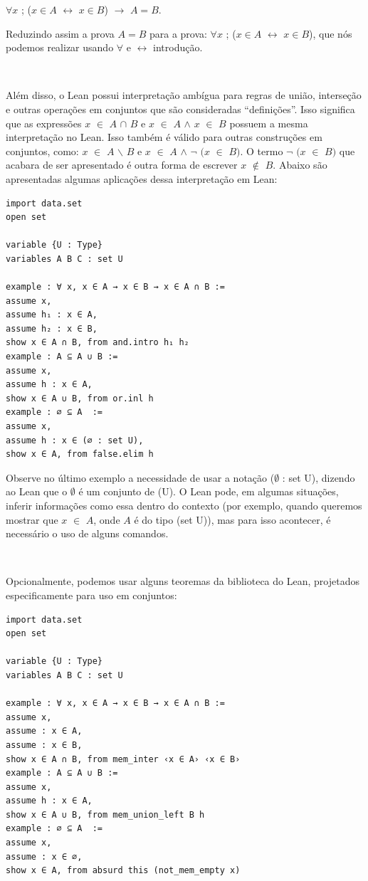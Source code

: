 \begin{center}
    $\forall x$ ; ($x \in A$ $\leftrightarrow$ $x \in B$) $\rightarrow$ $A = B$.  
\end{center}

Reduzindo assim a prova $A = B$ para a prova: $\forall x$ ; ($x \in A$ $\leftrightarrow$ $x \in B$), que nós podemos realizar usando $\forall$ e $\leftrightarrow$ introdução.

$\qquad$

Além disso, o Lean possui interpretação ambígua para regras de união, interseção e outras operações em conjuntos que são consideradas “definições”. Isso significa que as expressões $x$ $\in$ $A$ $\cap$ $B$ e $x$ $\in$ $A$ $\wedge$ $x$ $\in$ $B$ possuem a mesma interpretação no Lean. Isso também é válido para outras construções em conjuntos, como: $x$ $\in$ $A$ $\backslash $ $B$ e $x$ $\in$ $A$ $\wedge$ $\neg$ $(x$ $\in$ $B)$. O termo $\neg$ $(x$ $\in$ $B)$ que acabara de ser apresentado é outra forma de escrever $x$ $\notin$ $B$. Abaixo são apresentadas algumas aplicações dessa interpretação em Lean:

\begin{lstlisting}
import data.set
open set

variable {U : Type}
variables A B C : set U

example : ∀ x, x ∈ A → x ∈ B → x ∈ A ∩ B :=
assume x,
assume h₁ : x ∈ A,
assume h₂ : x ∈ B,
show x ∈ A ∩ B, from and.intro h₁ h₂
example : A ⊆ A ∪ B :=
assume x,
assume h : x ∈ A,
show x ∈ A ∪ B, from or.inl h
example : ∅ ⊆ A  :=
assume x,
assume h : x ∈ (∅ : set U),
show x ∈ A, from false.elim h

\end{lstlisting}

Observe no último exemplo a necessidade de usar a notação {
\selectfont ($\emptyset$ : set U)}, dizendo ao Lean que o $\emptyset$ é um conjunto de {
\selectfont (U)}. O Lean pode, em algumas situações, inferir informações como essa dentro do contexto (por exemplo, quando queremos mostrar que $x$ $\in$ $A$, onde $A$ é do tipo {
\selectfont (set U)}), mas para isso acontecer, é necessário o uso de alguns comandos.

$\qquad$

Opcionalmente, podemos usar alguns teoremas da biblioteca do Lean, projetados especificamente para uso em conjuntos:

\begin{lstlisting}
import data.set
open set

variable {U : Type}
variables A B C : set U

example : ∀ x, x ∈ A → x ∈ B → x ∈ A ∩ B :=
assume x,
assume : x ∈ A,
assume : x ∈ B,
show x ∈ A ∩ B, from mem_inter ‹x ∈ A› ‹x ∈ B›
example : A ⊆ A ∪ B :=
assume x,
assume h : x ∈ A,
show x ∈ A ∪ B, from mem_union_left B h
example : ∅ ⊆ A  :=
assume x,
assume : x ∈ ∅,
show x ∈ A, from absurd this (not_mem_empty x)
 
\end{lstlisting}

